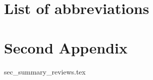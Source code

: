 \begin{appendices}

\section{List of abbreviations}
\printnomenclature


\clearpage
\section{Second Appendix}
{sec_summary_reviews.tex}
\end{appendices}